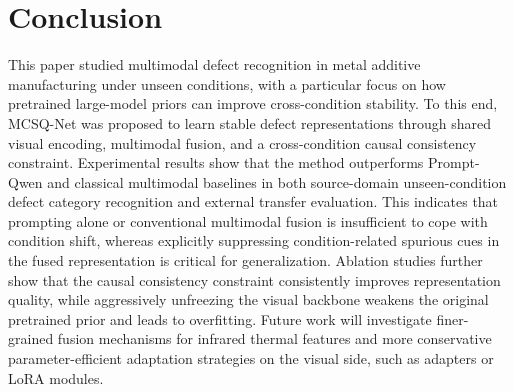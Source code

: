 \documentclass[journal]{IEEEtran}
\begin{document}
\section{Conclusion}

This paper studied multimodal defect recognition in metal additive manufacturing under unseen conditions, with a particular focus on how pretrained large-model priors can improve cross-condition stability. To this end, MCSQ-Net was proposed to learn stable defect representations through shared visual encoding, multimodal fusion, and a cross-condition causal consistency constraint. Experimental results show that the method outperforms Prompt-Qwen and classical multimodal baselines in both source-domain unseen-condition defect category recognition and external transfer evaluation. This indicates that prompting alone or conventional multimodal fusion is insufficient to cope with condition shift, whereas explicitly suppressing condition-related spurious cues in the fused representation is critical for generalization. Ablation studies further show that the causal consistency constraint consistently improves representation quality, while aggressively unfreezing the visual backbone weakens the original pretrained prior and leads to overfitting. Future work will investigate finer-grained fusion mechanisms for infrared thermal features and more conservative parameter-efficient adaptation strategies on the visual side, such as adapters or LoRA modules.
\end{document}
